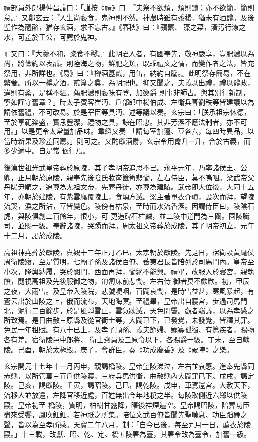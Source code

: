 \begin{pinyinscope}
 禮部員外郎楊仲昌議曰：「謹按《禮》曰：『夫祭不欲煩，煩則黷；亦不欲簡，簡則怠。』又鄭玄云：『人生尚褻食，鬼神則不然。神農時雖有黍稷，猶未有酒醴。及後
 聖作為醴酪，猶存玄酒，求不忘古。』《春秋》曰：『蘋蘩、藻之菜，潢污行潦之水，可羞於王公，可薦於鬼神。



 』又曰：『大羹不和，粢食不鑿。』此明君人者，有國奉先，敬神嚴享，豈肥濃以為尚，將儉約以表誠。則陸海之物，鮮肥之類，既乖禮文之情，而變作者之法，皆充祭用，非所詳也。《易》曰：『樽酒簋貳，用缶，納約自牖。』此明祭存簡易，不在繁奢。所以一樽之酒，貳簋之奠，為明祀也。抑又聞之，夫義以出禮，禮以體政，違則有紊，是稱不經。薦肥濃則褻味有登，加籩爵
 則事非師古。與其別行新制，寧如謹守舊章？」時太子賓客崔沔、戶部郎中楊伯成、左衛兵曹劉秩等皆建議以為請依舊禮，不可改易。於是宰臣等具沔、述等議以奏。玄宗曰：「朕承祖宗休德，至於享祀粢盛，實思豐潔，禮物之具，諒在昭忠。其非芳潔不應法制者，亦不可用。」以是更令太常量加品味。韋縚又奏：「請每室加籩、豆各六，每四時異品，以當時新果及珍羞同薦。」則可之。又酌獻酒爵，玄宗令用龠升一升，合於古義，而多少適中。自是常
 依行焉。



 後漢世祖光武皇帝葬於原陵，其子孝明帝追思不已。永平元年，乃率諸侯王、公卿，正月朝於原陵，親奉先後陰氏妝奩篋笥悲慟，左右侍臣，莫不嗚咽。梁武帝父丹陽尹順之，追尊為太祖文帝，先葬丹徒，亦尊為建陵。武帝即大位後，大同十五年，亦朝於建陵，有紫雲廕覆陵上，食頃方滅。梁主著單衣介幘，設次而拜，望陵流哭，淚之所沾，草皆變色。陵傍有枯泉，至時而水流香潔。因謂侍臣曰，陵陰石虎，與陵俱創二百餘年，恨小，可
 更造碑石柱麟，並二陵中道門為三闥。園陵職司，並賜一級。奉辭諸陵，哭踴而拜。周太祖文帝葬於成陵，其子明帝初立，元年十二月，謁於成陵。



 高祖神堯葬於獻陵，貞觀十三年正月乙巳，太宗朝於獻陵。先是日，宿衛設黃麾仗周衛陵寢，至是質明，七廟子孫及諸侯百僚、蕃夷君長皆陪列於司馬門內。皇帝至小次，降輿納履，哭於闕門，西面再拜，慟絕不能興。禮畢，改服入於寢宮，親執饌，閱視高祖及先後服御之物，匍匐床前悲慟。左右侍
 御者莫不歔欷。初，甲辰之夜，大雨雪。及皇帝入陵院，悲號哽咽，百闢哀慟，是時雪益甚，寒風暴起，有蒼云出於山陵之上，俄而流布，天地晦冥。至禮畢，皇帝出自寢宮，步過司馬門北，泥行二百餘步，於是風靜雪止，雲氣歇滅，天色開霽。觀者竊議，以為孝感之所致焉。是日曲赦三原縣及從官衛士等，大闢已下，已發覺，未發覺，皆釋其罪。免民一年租賦。有八十已上，及孝子順孫、義夫節婦、鰥寡孤獨、有篤疾者，賜物各有差。宿衛陵邑中郎將、
 衛士齋員及三原令以下，各賜爵一級。丁未，至自獻陵。己酉，朝於太極殿。庚子，會群臣，奏《功成慶善》及《破陣》之樂。



 玄宗開元十七年十一月丙申，親謁橋陵。皇帝望陵涕泣，左右並哀感。進奉先縣同赤縣，以所管萬三百戶供陵寢，三府兵馬供衛，曲赦縣內大闢罪已下。戊戌，謁定陵。己亥，謁獻陵。壬寅，謁昭陵。己巳，謁乾陵。戊申，車駕還宮。大赦天下，流移人並放還，左降官移近處，百姓無出今年地稅之半。每陵取側近六鄉以供陵寢。皇帝初至
 橋陵，質明，柏樹甘露降，曙後祥煙遍空。皇帝謁昭陵，陪葬功臣盡來受饗，鳳吹釭釭，若神祇之所集。陪位文武百僚皆聞先聖嘆息、功臣蹈舞之聲，皆以為至孝所感。天寶二年八月，制：「自今已後，每至九月一日，薦衣於陵寢。」十三載，改獻、昭、乾、定、橋五陵署為臺，其署令改為臺令，加舊一級。



\end{pinyinscope}